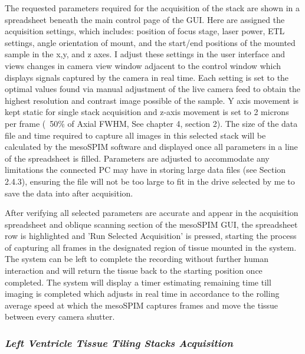 The requested parameters required for the acquisition of the stack are shown in a spreadsheet beneath the main control page of the GUI. Here are assigned the acquisition settings, which includes: position of focus stage, laser power, ETL settings, angle orientation of mount, and the start/end positions of the mounted sample in the x,y, and z axes. I adjust these settings in the user interface and views changes in camera view window adjacent to the control window which displays signals captured by the camera in real time. Each setting is set to the optimal values found via manual adjustment of the live camera feed to obtain the highest resolution and contrast image possible of the sample. Y axis movement is kept static for single stack acquisition and z-axis movement is set to 2 microns per frame (~50\% of Axial FWHM, See chapter 4, section 2). The size of the data file and time required to capture all images in this selected stack will be calculated by the mesoSPIM software and displayed once all parameters in a line of the spreadsheet is filled. Parameters are adjusted to accommodate any limitations the connected PC may have in storing large data files (see Section 2.4.3), ensuring the file will not be too large to fit in the drive selected by me to save the data into after acquisition. 

After verifying all selected parameters are accurate and appear in the acquisition spreadsheet and oblique scanning section of the mesoSPIM GUI, the spreadsheet row is highlighted and 'Run Selected Acquisition' is pressed, starting the process of capturing all frames in the designated region of tissue mounted in the system. The system can be left to complete the recording without further human interaction and will return the tissue back to the starting position once completed. The system will display a timer estimating remaining time till imaging is completed which adjusts in real time in accordance to the rolling average speed at which the mesoSPIM captures frames and move the tissue between every camera shutter.


\subsubsection{\textit{Left Ventricle Tissue Tiling Stacks Acquisition}}

